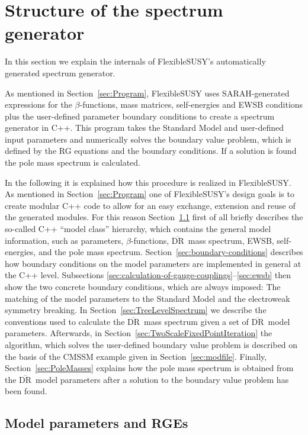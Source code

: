 \documentclass[final,3p,11pt,pdflatex]{elsarticle}
\makeatletter
\newcommand{\fs}{FlexibleSUSY\@\xspace}
\newcommand{\textoverline}[1]{$\overline{\mbox{#1}}$}
\newcommand{\DRbar}{\textoverline{DR}\xspace}
\newcommand{\secref}[1]{Section~\ref{#1}}
\makeatother
\begin{document}
\section{Structure of the spectrum generator}
\label{sec:SpecGenStruct}

In this section we explain the internals of \fs's automatically
generated spectrum generator.

As mentioned in \secref{sec:Program}, \fs uses SARAH-generated
expressions for the $\beta$-functions, mass matrices, self-energies
and EWSB conditions plus the user-defined parameter boundary
conditions to create a spectrum generator in C++.  This program takes
the Standard Model and user-defined input parameters and numerically
solves the boundary value problem, which is defined by the RG
equations and the boundary conditions.  If a solution is found the
pole mass spectrum is calculated.

In the following it is explained how this procedure is realized in
\fs.  As mentioned in \secref{sec:Program} one of \fs's design goals
is to create modular C++ code to allow for an easy exchange, extension
and reuse of the generated modules.  For this reason
\secref{sec:ModelParametersAndRGEs} first of all briefly describes the
so-called C++ ``model class'' hierarchy, which contains the general
model information, such as parameters, $\beta$-functions, \DRbar\ mass
spectrum, EWSB, self-energies, and the pole mass spectrum.
%
\secref{sec:boundary-conditions} describes how boundary conditions on
the model parameters are implemented in general at the C++ level.
Subsections \ref{sec:calculation-of-gauge-couplings}--\ref{sec:ewsb}
then show the two concrete boundary conditions, which are always
imposed: The matching of the model parameters to the Standard Model
and the electroweak symmetry breaking.
%
In \secref{sec:TreeLevelSpectrum} we describe the conventions used to
calculate the \DRbar\ mass spectrum given a set of \DRbar\ model
parameters.
%
Afterwards, in \secref{sec:TwoScaleFixedPointIteration} the algorithm,
which solves the user-defined boundary value problem is described on
the basis of the CMSSM example given in \secref{sec:modfile}.
%
Finally, \secref{sec:PoleMasses} explains how the pole mass spectrum
is obtained from the \DRbar\ model parameters after a solution to the
boundary value problem has been found.

\subsection{Model parameters and RGEs}
\label{sec:ModelParametersAndRGEs}
\end{document}
